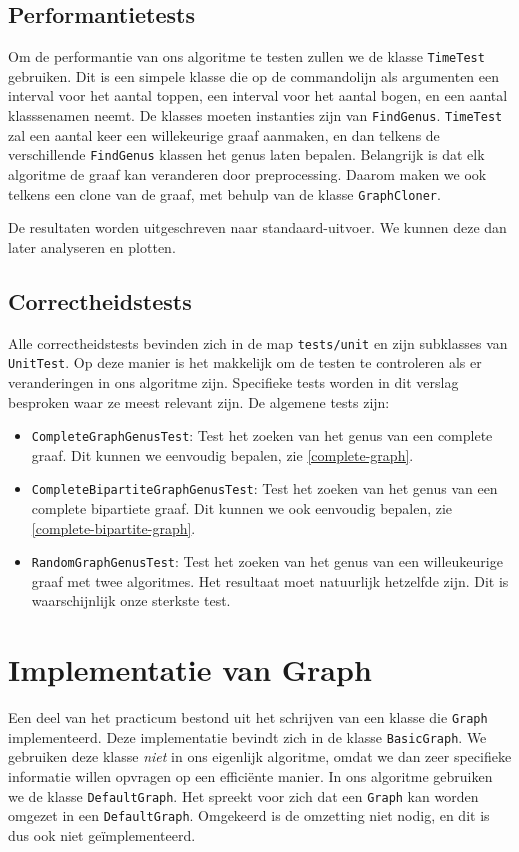 \documentclass{article}
\begin{document}
\subsection{Performantietests}
Om de performantie van ons algoritme te testen zullen we de klasse
\verb#TimeTest# gebruiken. Dit is een simpele klasse die op de commandolijn als
argumenten een interval voor het aantal toppen, een interval voor het aantal
bogen, en een aantal klasssenamen neemt. De klasses moeten instanties zijn van
\verb#FindGenus#. \verb#TimeTest# zal een aantal keer een willekeurige graaf
aanmaken, en dan telkens de verschillende \verb#FindGenus# klassen het genus
laten bepalen. Belangrijk is dat elk algoritme de graaf kan veranderen door
preprocessing. Daarom maken we ook telkens een clone van de graaf, met behulp
van de klasse \verb#GraphCloner#.
\newline

De resultaten worden uitgeschreven naar standaard-uitvoer. We kunnen deze dan
later analyseren en plotten.

\subsection{Correctheidstests}
\label{correctheidstests}
Alle correctheidstests bevinden zich in de map \verb#tests/unit# en zijn
subklasses van \verb#UnitTest#. Op deze manier is het makkelijk om de testen te
controleren als er veranderingen in ons algoritme zijn. Specifieke tests worden
in dit verslag besproken waar ze meest relevant zijn. De algemene tests zijn:
\begin{itemize}
\item \verb#CompleteGraphGenusTest#: Test het zoeken van het genus van een
complete graaf. Dit kunnen we eenvoudig bepalen, zie \ref{complete-graph}.
\item \verb#CompleteBipartiteGraphGenusTest#: Test het zoeken van het genus van
een complete bipartiete graaf. Dit kunnen we ook eenvoudig bepalen, zie 
\ref{complete-bipartite-graph}.
\item \verb#RandomGraphGenusTest#: Test het zoeken van het genus van een
willeukeurige graaf met twee algoritmes. Het resultaat moet natuurlijk
hetzelfde zijn. Dit is waarschijnlijk onze sterkste test.
\end{itemize}

\section{Implementatie van Graph}
Een deel van het practicum bestond uit het schrijven van een klasse die
\verb#Graph# implementeerd. Deze implementatie bevindt zich in de klasse
\verb#BasicGraph#. We gebruiken deze klasse \emph{niet} in ons
eigenlijk algoritme, omdat we dan zeer specifieke informatie willen opvragen
op een effici\"ente manier. In ons algoritme gebruiken we de klasse
\verb#DefaultGraph#. Het spreekt voor zich dat een \verb#Graph# kan worden
omgezet in een \verb#DefaultGraph#. Omgekeerd is de omzetting niet nodig, en dit
is dus ook niet ge\"implementeerd.
\end{document}
